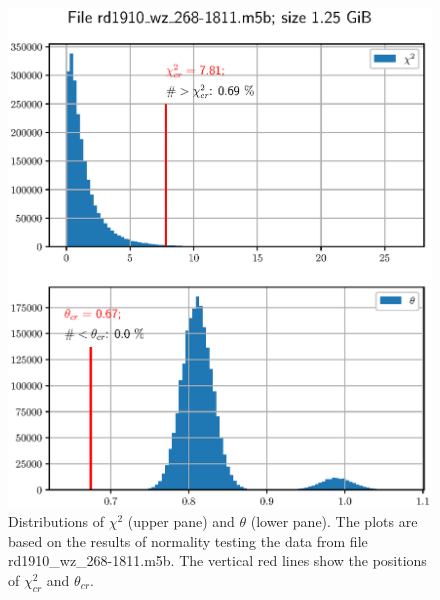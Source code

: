 \documentclass[letterpaper,twoside,12pt]{article}
\begin{document}
\begin{figure}[ht!]
  \begin{center}
  \includegraphics[width=35pc]{fig_chi2_and_thresh_distr_2.eps}
  \caption{\small Distributions of $\chi^2$ (upper pane) and $\theta$ (lower pane). The plots are based on the results of normality testing the data from file rd1910\_wz\_268-1811.m5b. The vertical red lines show the positions of $\chi^2_{cr}$ and $\theta_{cr}$. }
  \label{chi2_and_thresh_distr_2}
  \end{center}
\end{figure}
\end{document}
